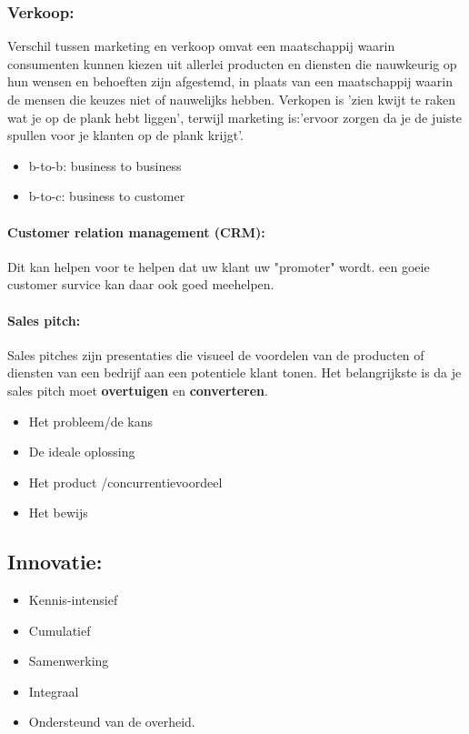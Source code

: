 \documentclass[12pt]{article}
\begin{document}
\subsubsection{Verkoop:}
Verschil tussen marketing en verkoop omvat een maatschappij waarin consumenten kunnen kiezen uit allerlei producten en diensten die nauwkeurig op hun wensen en behoeften zijn afgestemd, in plaats van een maatschappij waarin de mensen die keuzes niet of nauwelijks hebben.\newline
Verkopen is 'zien kwijt te raken wat je op de plank hebt liggen', terwijl marketing is:'ervoor zorgen da je de juiste spullen voor je klanten op de plank krijgt'.\begin{itemize}
    \item b-to-b: business to business
    \item b-to-c: business to customer
\end{itemize}
\paragraph{Customer relation management (CRM):}
Dit kan helpen voor te helpen dat uw klant uw "promoter" wordt. een goeie customer survice kan daar ook goed meehelpen. 
\paragraph{Sales pitch:}
Sales pitches zijn presentaties die visueel de voordelen van de producten of diensten van een bedrijf aan een potentiele klant tonen.\newline
Het belangrijkste is da je sales pitch moet \textbf{overtuigen} en \textbf{converteren}.
\begin{itemize}
    \item Het probleem/de kans 
    \item De ideale oplossing 
    \item Het product /concurrentievoordeel
    \item Het bewijs
\end{itemize}
\subsection{Innovatie:}
\begin{itemize}
    \item Kennis-intensief
    \item Cumulatief
    \item Samenwerking 
    \item Integraal 
    \item Ondersteund van de overheid.
\end{itemize}
\end{document}
